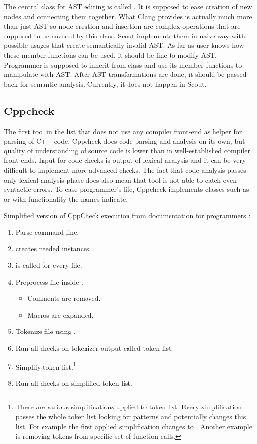 The central class for AST editing is called . It is supposed to ease creation of new nodes and connecting them together. What Clang provides is actually much more than just AST so node creation and insertion are complex operations that are supposed to be covered by this class. Scout implements them in naive way with possible usages that create semantically invalid AST. As far as user knows how these member functions can be used, it should be fine to modify AST. Programmer is supposed to inherit from  class and use its member functions to manipulate with AST. After AST transformations are done, it should be passed back for semantic analysis. Currently, it does not happen in Scout.

\subsection{Cppcheck}
The first tool in the list that does not use any compiler front-end as helper for parsing of C++ code. Cppcheck does code parsing and analysis on its own, but quality of understanding of source code is lower than in well-established compiler front-ends. Input for code checks is output of lexical analysis and it can be very difficult to implement more advanced checks. The fact that code analysis passes only lexical analysis phase does also mean that tool is not able to catch even syntactic errors. To ease programmer's life, Cppcheck implements classes such as  or  with functionality the names indicate.

Simplified version of CppCheck execution from documentation for programmers \cite{cppcheck-doxygen}:

\begin{enumerate}
\item Parse command line.
\item {} creates needed  instances.
\item {} is called for every file.
\item Preprocess file inside .
    \begin{itemize}
    \item Comments are removed.
    \item Macros are expanded.
    \end{itemize}
\item Tokenize file using .
\item Run all checks on tokenizer output called token list.
\item Simplify token list.\footnote{There are various simplifications applied to token list. Every simplification passes the whole token list looking for patterns and potentially changes this list. For example the first applied simplification changes  to . Another example is removing  tokens from specific set of function calls.}
\item Run all checks on simplified token list.
\end{enumerate}
